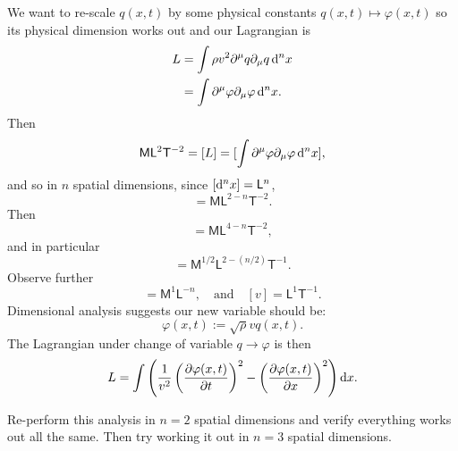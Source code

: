 We want to re-scale $q(x,t)$ by some physical constants
$q(x,t)\mapsto\varphi(x,t)$ so its physical dimension works out and our
Lagrangian is
\begin{equation}
  \begin{split}
L &= \int \rho v^{2}\partial^{\mu}q\partial_{\mu}q\,\mathrm{d}^{n}x\\
&= \int \partial^{\mu}\varphi\partial_{\mu}\varphi\,\mathrm{d}^{n}x.
  \end{split}
\end{equation}
Then
\begin{equation}
\mathsf{M}\mathsf{L}^{2}\mathsf{T}^{-2} = [L] = [\int \partial^{\mu}\varphi\partial_{\mu}\varphi\,\mathrm{d}^{n}x],
\end{equation}
and so in $n$ spatial dimensions, since $[\mathrm{d}^{n}x]=\mathsf{L}^{n}$,
\begin{equation}
[\partial^{\mu}\varphi\partial_{\mu}\varphi] = \mathsf{M}\mathsf{L}^{2-n}\mathsf{T}^{-2}.
\end{equation}
Then
\begin{equation}
[\varphi^{2}] = \mathsf{M}\mathsf{L}^{4-n}\mathsf{T}^{-2},
\end{equation}
and in particular
\begin{equation}
[\varphi] = \mathsf{M}^{1/2}\mathsf{L}^{2-(n/2)}\mathsf{T}^{-1}.
\end{equation}
Observe further
\begin{equation}
[\rho]=\mathsf{M}^{1}\mathsf{L}^{-n},\quad\mbox{and}\quad
[v]=\mathsf{L}^{1}\mathsf{T}^{-1}.
\end{equation}
Dimensional analysis suggests our new variable should
be:
\begin{equation}\label{eq:classical-field-theory:linear-chain:change-of-variables-to-varphi}
\boxed{\varphi(x,t) := \sqrt{\rho}vq(x,t).}
\end{equation}
The Lagrangian under change of variable $q\to\varphi$ is then
\begin{equation}
L = \int\left(\frac{1}{v^{2}}\left(\frac{\partial\varphi(x,t)}{\partial t}\right)^{2}
-\left(\frac{\partial\varphi(x,t)}{\partial x}\right)^{2}\right)\mathrm{d} x.
\end{equation}

\begin{exercise}
Re-perform this analysis in $n=2$ spatial dimensions and verify
everything works out all the same. Then try working it out in $n=3$
spatial dimensions. 
\end{exercise}

